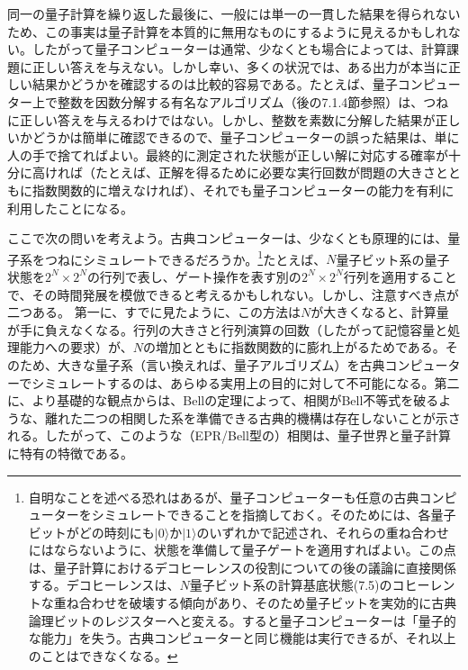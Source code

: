 同一の量子計算を繰り返した最後に、一般には単一の一貫した結果を得られないため、この事実は量子計算を本質的に無用なものにするように見えるかもしれない。したがって量子コンピューターは通常、少なくとも場合によっては、計算課題に正しい答えを与えない。しかし幸い、多くの状況では、ある出力が本当に正しい結果かどうかを確認するのは比較的容易である。たとえば、量子コンピューター上で整数を因数分解する有名なアルゴリズム（後の7.1.4節参照）は、つねに正しい答えを与えるわけではない。しかし、整数を素数に分解した結果が正しいかどうかは簡単に確認できるので、量子コンピューターの誤った結果は、単に人の手で捨てればよい。最終的に測定された状態が正しい解に対応する確率が十分に高ければ（たとえば、正解を得るために必要な実行回数が問題の大きさとともに指数関数的に増えなければ）、それでも量子コンピューターの能力を有利に利用したことになる。

ここで次の問いを考えよう。古典コンピューターは、少なくとも原理的には、量子系をつねにシミュレートできるだろうか。\footnote{自明なことを述べる恐れはあるが、量子コンピューターも任意の古典コンピューターをシミュレートできることを指摘しておく。そのためには、各量子ビットがどの時刻にも$|0\rangle$か$|1\rangle$のいずれかで記述され、それらの重ね合わせにはならないように、状態を準備して量子ゲートを適用すればよい。この点は、量子計算におけるデコヒーレンスの役割についての後の議論に直接関係する。デコヒーレンスは、$N$量子ビット系の計算基底状態(7.5)のコヒーレントな重ね合わせを破壊する傾向があり、そのため量子ビットを実効的に古典論理ビットのレジスターへと変える。すると量子コンピューターは「量子的な能力」を失う。古典コンピューターと同じ機能は実行できるが、それ以上のことはできなくなる。}たとえば、$N$量子ビット系の量子状態を$2^N\times2^N$の行列で表し、ゲート操作を表す別の$2^N\times2^N$行列を適用することで、その時間発展を模倣できると考えるかもしれない。しかし、注意すべき点が二つある。
\hypertarget{srcpage:299}{}\label{srcpage:299}
第一に、すでに見たように、この方法は$N$が大きくなると、計算量が手に負えなくなる。行列の大きさと行列演算の回数（したがって記憶容量と処理能力への要求）が、$N$の増加とともに指数関数的に膨れ上がるためである。そのため、大きな量子系（言い換えれば、量子アルゴリズム）を古典コンピューターでシミュレートするのは、あらゆる実用上の目的に対して不可能になる。第二に、より基礎的な観点からは、Bellの定理\cite{ref030}によって、相関がBell不等式を破るような、離れた二つの相関した系を準備できる古典的機構は存在しないことが示される。したがって、このような（EPR/Bell型の）相関は、量子世界と量子計算に特有の特徴である\cite{ref335,ref336}。

